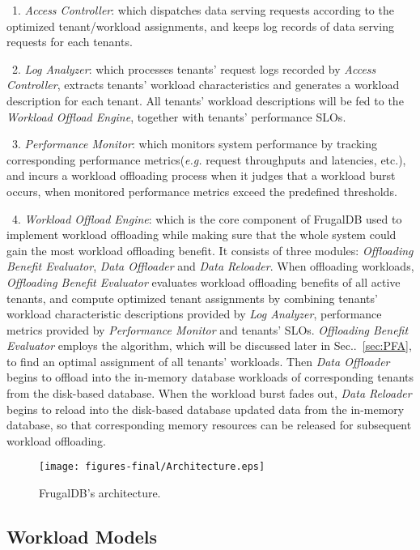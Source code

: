 ~1. \emph{Access Controller}: which dispatches data serving requests according to the optimized tenant/workload assignments, and keeps log records of data serving requests for each tenants.

~2. \emph{Log Analyzer}: which processes tenants' request logs recorded by \emph{Access Controller}, extracts tenants' workload characteristics and generates a workload description for each tenant. All tenants' workload descriptions will be fed to the \emph{Workload Offload Engine}, together with tenants' performance SLOs.

~3. \emph{Performance Monitor}: which monitors system performance by tracking corresponding performance metrics(\emph{e.g.} request throughputs and latencies, etc.), and incurs a workload offloading process when it judges that a workload burst occurs, when monitored performance metrics exceed the predefined thresholds.

~4. \emph{Workload Offload Engine}: which is the core component of FrugalDB used to implement workload offloading while making sure that the whole system could gain the most workload offloading benefit. It consists of three modules: \emph{Offloading Benefit Evaluator}, \emph{Data Offloader} and \emph{Data Reloader}. When offloading workloads, \emph{Offloading Benefit Evaluator} evaluates workload offloading benefits of all active tenants, and compute optimized tenant assignments by combining tenants' workload characteristic descriptions provided by \emph{Log Analyzer}, performance metrics provided by \emph{Performance Monitor} and tenants' SLOs. \emph{Offloading Benefit Evaluator} employs the algorithm, which will be discussed later in Sec..~\ref{sec:PFA}, to find an optimal assignment of all tenants' workloads. Then \emph{Data Offloader} begins to offload into the in-memory database workloads of corresponding tenants from the disk-based database. When the workload burst fades out, \emph{Data Reloader} begins to reload into the disk-based database updated data from the in-memory database, so that corresponding memory resources can be released for subsequent workload offloading.

\begin{figure}[!htb]
\centering
\texttt{[image: figures-final/Architecture.eps]}
\caption{FrugalDB's architecture.}
\label{fig:Architecture}
\end{figure}

\subsection{Workload Models}

